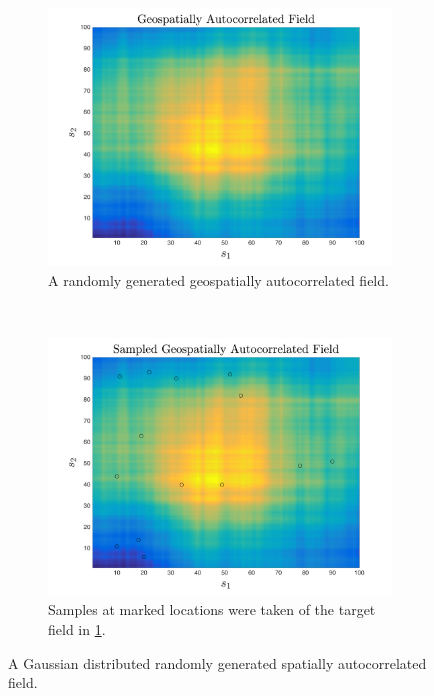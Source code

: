 \begin{figure}[ht!]
    \centering
    \begin{subfigure}[t]{0.5\textwidth}
        \centering
        \includegraphics[width=\linewidth]{figures/generated_field.png}
        \captionsetup{skip=0.5\baselineskip,size=footnotesize}
        \ssp
        \caption{A randomly generated geospatially autocorrelated field.}
		\label{fig:gen_field}
    \end{subfigure}%
    ~ 
    \begin{subfigure}[t]{0.5\textwidth}
        \centering
        \includegraphics[width=\linewidth]{figures/sampled_generated_field.png}
		\captionsetup{skip=0.5\baselineskip,size=footnotesize}
		\ssp
        \caption{Samples at marked locations were taken of the target field in \ref{fig:gen_field}.}
		\label{fig:sampled_field}
    \end{subfigure}
    \ssp
    \caption{A Gaussian distributed randomly generated spatially autocorrelated field.}
    \label{fig:generated_and_sampled_field}
\end{figure}

